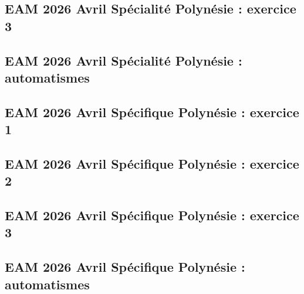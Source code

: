 \documentclass[lang=fr,edition=teacher,layout=sheet]{mxbook}
\begin{document}
\begingroup\endgroup
\par\bigskip
{}\subsection*{EAM 2026 Avril Spécialité Polynésie : exercice 3}
\begingroup\endgroup
\par\bigskip
{}\subsection*{EAM 2026 Avril Spécialité Polynésie : automatismes}
\begingroup\endgroup
\par\bigskip
{}\subsection*{EAM 2026 Avril Spécifique Polynésie : exercice 1}
\begingroup\endgroup
\par\bigskip
{}\subsection*{EAM 2026 Avril Spécifique Polynésie : exercice 2}
\begingroup\endgroup
\par\bigskip
{}\subsection*{EAM 2026 Avril Spécifique Polynésie : exercice 3}
\begingroup\endgroup
\par\bigskip
{}\subsection*{EAM 2026 Avril Spécifique Polynésie : automatismes}
\begingroup\endgroup
\end{document}
